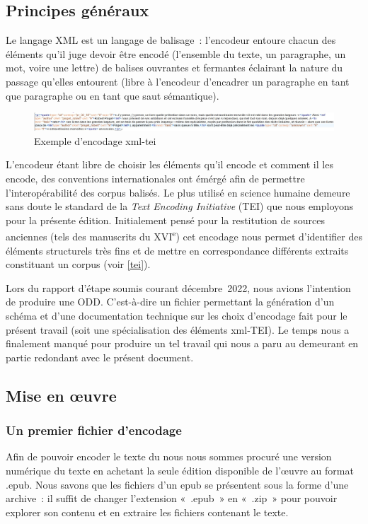     \subsection{Principes généraux}
Le langage XML est un langage de balisage~: l'encodeur entoure chacun des éléments qu'il juge devoir être encodé (l'ensemble du texte, un paragraphe, un mot, voire une lettre) de balises ouvrantes et fermantes éclairant la nature du passage qu'elles entourent (libre à l'encodeur d'encadrer un paragraphe en tant que paragraphe ou en tant que saut sémantique).

\begin{figure}[H]
    \centering
    \includegraphics[scale=0.5]{img/screen_encodage.jpg}
    \caption{Exemple d'encodage xml-tei}
    \label{fig:screen_encodage}
\end{figure}

L'encodeur étant libre de choisir les éléments qu'il encode et comment il les encode, des conventions internationales ont émérgé afin de permettre l'interopérabilité des corpus balisés. Le plus utilisé en science humaine demeure sans doute le standard de la \textit{Text Encoding Initiative} (TEI) que nous employons pour la présente édition. Initialement pensé pour la restitution de sources anciennes (tels des manuscrits du \textsc{XVI}\textsuperscript{e}) cet encodage nous permet d'identifier des éléments structurels très fins et de mettre en correspondance différents extraits constituant un corpus (voir \ref{tei}).

Lors du rapport d'étape soumis courant décembre~2022, nous avions l'intention de produire une ODD. C'est-à-dire un fichier permettant la génération d'un schéma et d'une documentation technique sur les choix d'encodage fait pour le présent travail (soit une spécialisation des éléments xml-TEI). Le temps nous a finalement manqué pour produire un tel travail qui nous a paru au demeurant en partie redondant avec le présent document.


    \subsection{Mise en œuvre}


\subsubsection{Un premier fichier d'encodage}
\label{premier_enc}
Afin de pouvoir encoder le texte du \punr{} nous nous sommes procuré une version numérique du texte en achetant la seule édition disponible de l'œuvre au format \go.epub\gf. Nous savons que les fichiers d'un epub se présentent sous la forme d'une archive~: il suffit de changer l'extension «~.epub~» en «~.zip~» pour pouvoir explorer son contenu et en extraire les fichiers contenant le texte.

